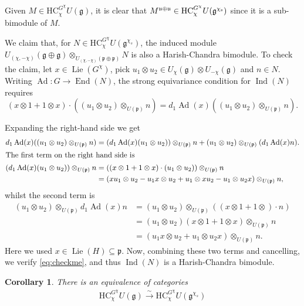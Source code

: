 \documentclass[twoside,12pt,reqno]{amsart}
\newtheorem{Corollary}[Theorem]{Corollary}
\theoremstyle{remark}
\numberwithin{equation}{section}
\def\isoto{\overset{\sim}{\longrightarrow}}
\def\rs{{\mathrm s}}
\def\Lie{\operatorname{Lie}}
\def\Ad{\operatorname{Ad}}
\def\Ind{\operatorname{Ind}}
\def\End{\operatorname{End}}
\def\HC{\mathrm{HC}}
\def\g{{\mathfrak g}}
\def\p{\mathfrak p}
\def\u{\mathfrak{u}}
\renewcommand{\rs}{{\rm s}}
\begin{document}
Given $M \in \HC_\chi^{G^\chi} U(\g)$, it is clear that $M^{\u \oplus \u}\in \HC_\chi^{G^\chi} U(\g^{\chi_\rs})$ since it is a sub-bimodule of $M$.

We claim that, for $N \in \HC_\chi^{G^\chi} U(\g^{\chi_s})$, the induced module $U_{(\chi, -\chi)}(\g \oplus \g) \otimes_{U_{(\chi, -\chi)} (\p \oplus \p)} N$ is also a Harish-Chandra bimodule. To check the claim, let $x\in \Lie(G^\chi)$, pick $u_1 \otimes u_2 \in U_\chi(\g) \otimes U_{-\chi}(\g)$ and $n \in N$. Writing $\Ad : G \to \End(N)$, the strong equivariance condition for $\Ind(N)$ requires
\begin{equation}
\label{eq:checkme}
    (x \otimes 1 + 1 \otimes x) \cdot ((u_1 \otimes u_2) \otimes_{U(\p)} n) = d_1 \Ad (x) ((u_1 \otimes u_2) \otimes_{U(\p)} n).
\end{equation}

Expanding the right-hand side we get
\begin{align*}
    d_1 \Ad(x) ((u_1 \otimes u_2) \otimes_{U(\p)} n) &= (d_1 \Ad(x) (u_1 \otimes u_2)) \otimes_{U(\p)} n + (u_1 \otimes u_2) \otimes_{U(\p)} (d_1 \Ad(x) n). \\
\intertext{The first term on the right hand side is}
    (d_1 \Ad(x) (u_1 \otimes u_2)) \otimes_{U(\p)} n &= ((x \otimes 1 + 1 \otimes x) \cdot (u_1 \otimes u_2) )\otimes_{U(\p)} n \\
    &= (xu_1 \otimes u_2 - u_1 x \otimes u_2 + u_1 \otimes x u_2 - u_1 \otimes u_2 x) \otimes_{U(\p)} n,
\end{align*}
whilst the second term is
\begin{align*}
    (u_1 \otimes u_2) \otimes_{U(\p)} d_1 \Ad(x) n &= (u_1 \otimes u_2) \otimes_{U(\p)} ((x \otimes 1 + 1 \otimes ) \cdot n) \\
    &= (u_1 \otimes u_2)(x \otimes 1 + 1 \otimes x) \otimes_{U(\p)} n \\
    &= (u_1 x \otimes u_2 + u_1 \otimes u_2 x) \otimes_{U(\p)} n.
\end{align*}
Here we used $x \in \Lie(H) \subseteq \p$. 
Now, combining these two terms and cancelling, we verify \eqref{eq:checkme}, and thus $\Ind(N)$ is a Harish-Chandra bimodule.

\begin{Corollary}\label{c:HCInd}
    There is an equivalence of categories 
    \begin{eqnarray}
    \label{eq:HCInd}
        \HC^{G^\chi}_{\chi} U(\g) \isoto \HC^{G^\chi}_{\chi} U(\g^{\chi_s})
    \end{eqnarray}
\end{Corollary}
\end{document}
